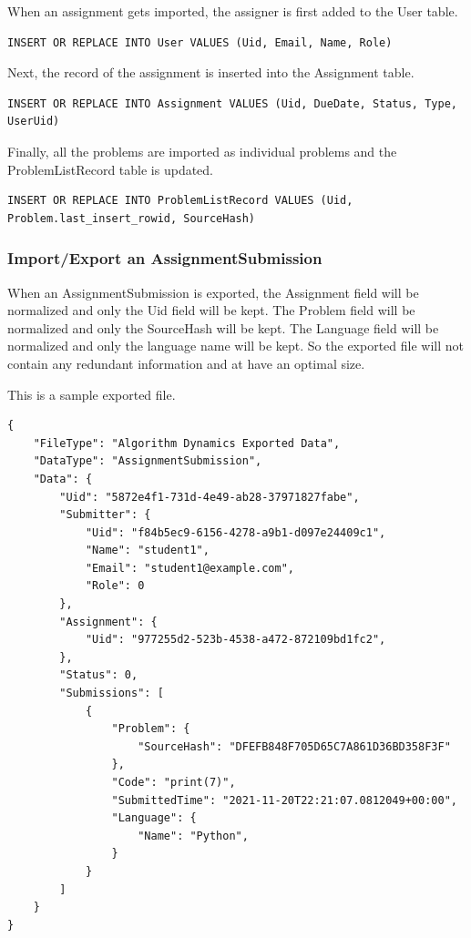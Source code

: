 \documentclass[a4paper]{report}
\begin{document}
When an assignment gets imported, the assigner is first added to the User table.

\begin{verbatim}
INSERT OR REPLACE INTO User VALUES (Uid, Email, Name, Role)
\end{verbatim}

Next, the record of the assignment is inserted into the Assignment table.

\begin{verbatim}
INSERT OR REPLACE INTO Assignment VALUES (Uid, DueDate, Status, Type, UserUid)
\end{verbatim}

Finally, all the problems are imported as individual problems and the ProblemListRecord table is updated.

\begin{verbatim}
INSERT OR REPLACE INTO ProblemListRecord VALUES (Uid, Problem.last_insert_rowid, SourceHash)
\end{verbatim}

\subsubsection{Import/Export an AssignmentSubmission}

When an AssignmentSubmission is exported, the Assignment field will be normalized and only the Uid field will be kept. The Problem field will be normalized and only the SourceHash will be kept. The Language field will be normalized and only the language name will be kept. So the exported file will not contain any redundant information and at have an optimal size.

This is a sample exported file.

\begin{verbatim}
{
    "FileType": "Algorithm Dynamics Exported Data",
    "DataType": "AssignmentSubmission",
    "Data": {
        "Uid": "5872e4f1-731d-4e49-ab28-37971827fabe",
        "Submitter": {
            "Uid": "f84b5ec9-6156-4278-a9b1-d097e24409c1",
            "Name": "student1",
            "Email": "student1@example.com",
            "Role": 0
        },
        "Assignment": {
            "Uid": "977255d2-523b-4538-a472-872109bd1fc2",
        },
        "Status": 0,
        "Submissions": [
            {
                "Problem": {
                    "SourceHash": "DFEFB848F705D65C7A861D36BD358F3F"
                },
                "Code": "print(7)",
                "SubmittedTime": "2021-11-20T22:21:07.0812049+00:00",
                "Language": {
                    "Name": "Python",
                }
            }
        ]
    }
}
\end{verbatim}
\end{document}
